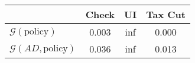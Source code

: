 \begin{tabular}{@{}lccc@{}} 
\toprule 
                          & Check      & UI    & Tax Cut    \\  \midrule 
$\mathcal{G}(\text{policy})$ & 0.003  & inf  & 0.000     \\ 
$\mathcal{G}(AD,\text{policy})$ & 0.036  & inf  & 0.013     \\ 
\end{tabular}  
